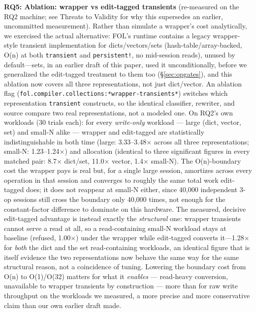 \documentclass[sigplan,review,anonymous]{acmart}
\begin{document}
\textbf{RQ5: Ablation: wrapper vs edit-tagged transients} (re-measured on the RQ2 machine; see Threats to Validity for why this supersedes an earlier, uncommitted measurement). Rather than simulate a wrapper's cost analytically, we exercised the actual alternative: FOL's runtime contains a legacy wrapper-style transient implementation for dicts/vectors/sets (hash-table/array-backed, O(n) at both \texttt{transient} and \texttt{persistent!}, no mid-session reads), unused by default---sets, in an earlier draft of this paper, used it unconditionally, before we generalized the edit-tagged treatment to them too (§\ref{sec:opgates}), and this ablation now covers all three representations, not just dict/vector. An ablation flag (\texttt{fol.compiler.collections:*wrapper-transients*}) switches which representation \texttt{transient} constructs, so the identical classifier, rewriter, and source compare two real representations, not a modeled one. On RQ2's own workloads (30 trials each): for every \emph{write-only} workload --- large (dict, vector, set) and small-N alike --- wrapper and edit-tagged are statistically indistinguishable in both time (large: 3.33--3.48$\times$ across all three representations; small-N: 1.23--1.24$\times$) and allocation (identical to three significant figures in every matched pair: 8.7$\times$ dict/set, 11.0$\times$ vector, 1.4$\times$ small-N). The O(n)-boundary cost the wrapper pays is real but, for a single large session, amortizes across every operation in that session and converges to roughly the same total work edit-tagged does; it does not reappear at small-N either, since 40{,}000 independent 3-op sessions still cross the boundary only 40{,}000 times, not enough for the constant-factor difference to dominate on this hardware. The measured, decisive edit-tagged advantage is instead exactly the \emph{structural} one: wrapper transients cannot serve a read at all, so a read-containing small-N workload stays at baseline (refused, 1.00$\times$) under the wrapper while edit-tagged converts it---1.28$\times$ for \emph{both} the dict and the set read-containing workloads, an identical figure that is itself evidence the two representations now behave the same way for the same structural reason, not a coincidence of tuning. Lowering the boundary cost from O(n) to O(1)/O(32) matters for what it \emph{enables} --- read-heavy conversion, unavailable to wrapper transients by construction --- more than for raw write throughput on the workloads we measured, a more precise and more conservative claim than our own earlier draft made.
\end{document}
